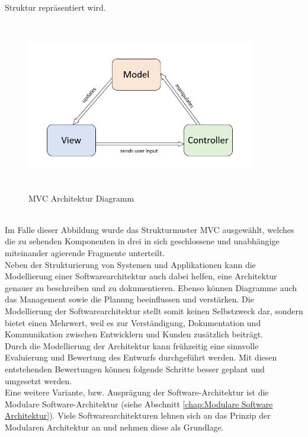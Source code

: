 Struktur repräsentiert wird.
\begin{figure}[hbt!]
    \centering
    \includegraphics[width=10cm,height=7.5cm,keepaspectratio]{2GrundlagenX/Bilder/MVCArchitecture.png}
    \caption{MVC Architektur Diagramm \cite{mvcbild.2020}}
    \label{pic:mvcdiagram}
\end{figure} 
\\
Im Falle dieser Abbildung wurde das Strukturmuster \ac{MVC} ausgewählt, welches die zu sehenden Komponenten in drei in sich 
geschlossene und unabhängige miteinander agierende Fragmente unterteilt. 
\\ 
\linebreak
Neben der Strukturierung von Systemen und Applikationen kann die Modellierung einer Softwarearchitektur auch dabei helfen, eine Architektur genauer 
zu beschreiben und zu dokumentieren. Ebenso können Diagramme auch das Management sowie die Planung beeinflussen und verstärken. Die Modellierung 
der Softwarearchitektur stellt somit keinen Selbstzweck dar, sondern bietet einen Mehrwert, weil es zur Verständigung, Dokumentation und 
Kommunikation zwischen Entwicklern und Kunden zusätzlich beiträgt. 
\\ 
Durch die Modellierung der Architektur kann frühzeitig eine sinnvolle Evaluierung und Bewertung des Entwurfs durchgeführt werden. Mit diesen 
entstehenden Bewertungen können folgende Schritte besser geplant und umgesetzt werden. 
\\ 
\linebreak
Eine weitere Variante, bzw. Ausprägung der Software-Architektur ist die Modulare Software-Architektur (siehe Abschnitt \ref{chap:Modulare Software Architektur}).
Viele Softwarearchitekturen lehnen sich an das Prinzip der Modularen Architektur an und nehmen diese als Grundlage.

